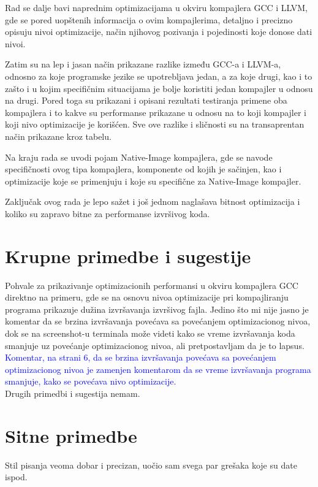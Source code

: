 \documentclass[a4paper]{report}
\newcommand{\odgovor}[1]{\textcolor{blue}{#1}}
\begin{document}
Rad se dalje bavi naprednim optimizacijama u okviru kompajlera GCC i LLVM, gde se pored uopštenih informacija o ovim kompajlerima, detaljno i precizno opisuju nivoi optimizacije, način njihovog pozivanja i pojedinosti koje donose dati nivoi. 

Zatim su na lep i jasan način prikazane razlike između GCC-a i LLVM-a, odnosno za koje programske jezike se upotrebljava jedan, a za koje drugi, kao i to zašto i u kojim specifičnim situacijama je bolje koristiti jedan kompajler u odnosu na drugi. Pored toga su prikazani i opisani rezultati testiranja primene oba kompajlera i to kakve su performanse prikazane u odnosu na to koji kompajler i koji nivo optimizacije je korišćen.
Sve ove razlike i sličnosti su na transaprentan način prikazane kroz tabelu.

Na kraju rada se uvodi pojam Native-Image kompajlera, gde se navode specifičnosti ovog tipa kompajlera, komponente od kojih je sačinjen, kao i optimizacije koje se primenjuju i koje su specifične za Native-Image kompajler.

Zaključak ovog rada je lepo sažet i još jednom naglašava bitnost optimizacija i koliko su zapravo bitne za performanse izvršivog koda.


\section{Krupne primedbe i sugestije}
Pohvale za prikazivanje optimizacionih performansi u okviru kompajlera GCC direktno na primeru, gde se na osnovu nivoa optimizacije pri kompajliranju programa prikazuje dužina izvršavanja izvršivog fajla. Jedino što mi nije jasno je komentar da se brzina izvršavanja povećava sa povećanjem optimizacionog nivoa, dok se na screenshot-u terminala može videti kako se vreme izvršavanja koda smanjuje uz povećanje optimizacionog nivoa, ali pretpostavljam da je to lapsus. \\ \odgovor{Komentar, na strani 6, da se brzina izvršavanja povećava sa povećanjem optimizacionog nivoa je zamenjen komentarom da se vreme izvršavanja programa smanjuje, kako se povećava nivo optimizacije. } \\
Drugih primedbi i sugestija nemam.

\section{Sitne primedbe}
Stil pisanja veoma dobar i precizan, uočio sam svega par grešaka koje su date ispod.
\end{document}

